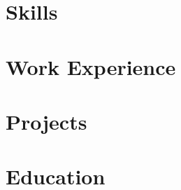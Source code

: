 \documentclass[letter,10pt]{article}
\begin{document}
% 

\section{Skills}


\section{Work Experience}


\section{Projects}


\section{Education}

\end{document}
